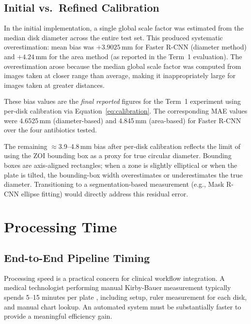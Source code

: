 \subsection{Initial vs.\ Refined Calibration}

In the initial implementation, a single global scale factor was estimated from
the median disk diameter across the entire test set.
This produced systematic overestimation:
mean bias was $+3.9025$\,mm for Faster R-CNN (diameter method)
and $+4.24$\,mm for the area method (as reported in the Term~1 evaluation).
The overestimation arose because the median global scale factor was computed from images
taken at closer range than average,
making it inappropriately large for images taken at greater distances.

These bias values are the \emph{final reported} figures for the Term~1 experiment using
per-disk calibration via Equation~\ref{eq:calibration}.
The corresponding MAE values were 4.6525\,mm (diameter-based) and 4.845\,mm (area-based)
for Faster R-CNN over the four antibiotics tested.

The remaining $\approx$3.9--4.8\,mm bias after per-disk calibration reflects the limit of
using the ZOI bounding box as a proxy for true circular diameter.
Bounding boxes are axis-aligned rectangles; when a zone is slightly elliptical
or when the plate is tilted, the bounding-box width overestimates or underestimates
the true diameter.
Transitioning to a segmentation-based measurement (e.g., Mask R-CNN ellipse fitting)
would directly address this residual error.

\section{Processing Time}
\label{sec:processing_time}

\subsection{End-to-End Pipeline Timing}

Processing speed is a practical concern for clinical workflow integration.
A medical technologist performing manual Kirby-Bauer measurement typically
spends 5--15 minutes per plate \cite{humphries2018},
including setup, ruler measurement for each disk, and manual chart lookup.
An automated system must be substantially faster to provide a meaningful efficiency gain.

